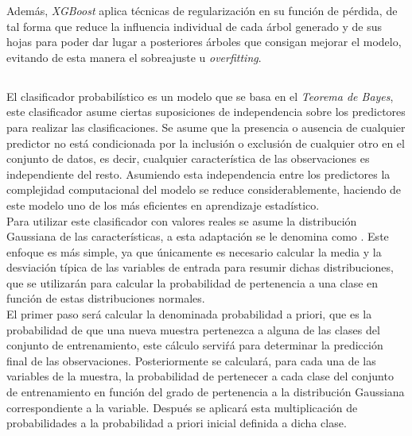             
            Además, \textit{XGBoost} aplica técnicas de regularización en su función de pérdida, de tal forma que reduce la influencia individual de cada árbol generado y de sus hojas para poder dar lugar a posteriores árboles que consigan mejorar el modelo, evitando de esta manera el sobreajuste u \textit{overfitting}.


        \subsection {}

        El clasificador probabilístico  es un modelo que se basa en el \textit{Teorema de Bayes}, este clasificador asume ciertas suposiciones de independencia sobre los predictores para realizar las clasificaciones. Se asume que la presencia o ausencia de cualquier predictor no está condicionada por la inclusión o exclusión de cualquier otro en el conjunto de datos, es decir, cualquier característica de las observaciones es independiente del resto. Asumiendo esta independencia entre los predictores la complejidad computacional del modelo se reduce considerablemente, haciendo de este modelo uno de los más eficientes en aprendizaje estadístico.\\

        Para utilizar este clasificador con valores reales se asume la distribución Gaussiana de las características, a esta adaptación se le denomina como . Este enfoque es más simple, ya que únicamente es necesario calcular la media y la desviación típica de las variables de entrada para resumir dichas distribuciones, que se utilizarán para calcular la probabilidad de pertenencia a una clase en función de estas distribuciones normales.\\

        El primer paso será calcular la denominada probabilidad a priori, que es la probabilidad de que una nueva muestra pertenezca a alguna de las clases del conjunto de entrenamiento, este cálculo serviŕá para determinar la predicción final de las observaciones. Posteriormente se calculará, para cada una de las variables de la muestra, la probabilidad de pertenecer a cada clase del conjunto de entrenamiento en función del grado de pertenencia a la distribución Gaussiana correspondiente a la variable. Después se aplicará esta multiplicación de probabilidades a la probabilidad a priori inicial definida a dicha clase.

        \subsection {}


